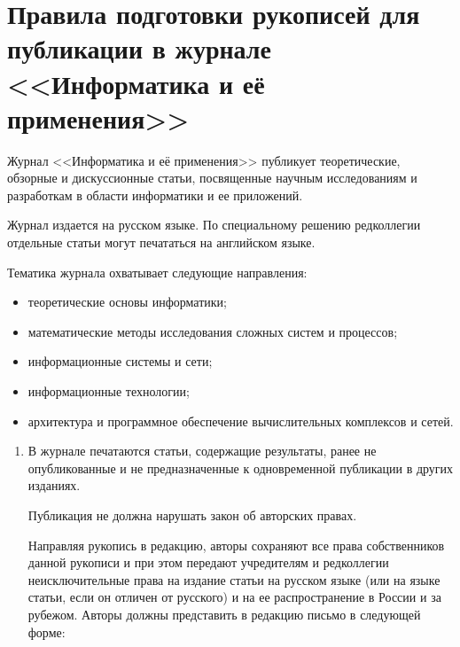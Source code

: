 \vspace*{-60pt} %
{ %
\section*{Правила подготовки рукописей  для публикации в журнале
<<Информатика и её применения>>}

\vspace*{12pt}

\thispagestyle{empty}

Журнал <<Информатика и её применения>> 
публикует теоретические, обзорные и дискуссионные статьи, 
посвященные научным исследованиям и разработкам в области 
информатики и ее приложений. 

Журнал издается на русском языке. По специальному решению 
редколлегии отдельные статьи могут печататься на английском языке. 

Тематика журнала охватывает следующие направления: 
\begin{itemize}
\item теоретические основы информатики;\\[-13.5pt] 
      \item
математические методы исследования сложных систем и процессов;\\[-13.5pt] 
           \item
информационные системы и сети;\\[-13.5pt] 
                \item
информационные технологии;\\[-13.5pt] 
                     \item
архитектура и программное обеспечение вычислительных комплексов и сетей.\\[-13.5pt] 
\end{itemize}


\noindent
\begin{enumerate}[1.]
\item В журнале печатаются статьи, содержащие результаты, ранее не опубликованные и 
не предназначенные к одновременной публикации в других изданиях.  

Публикация не должна нарушать закон об авторских правах.  

Направляя рукопись в редакцию, авторы сохраняют все права собственников данной 
рукописи и при этом передают учредителям и редколлегии неисключительные права на 
издание статьи на русском языке (или на языке статьи, если он отличен от рус\-ско\-го) и на 
ее распространение в России и за рубежом. Авторы должны пред\-ста\-вить в редакцию 
письмо в следующей форме: 


\end{enumerate}}
